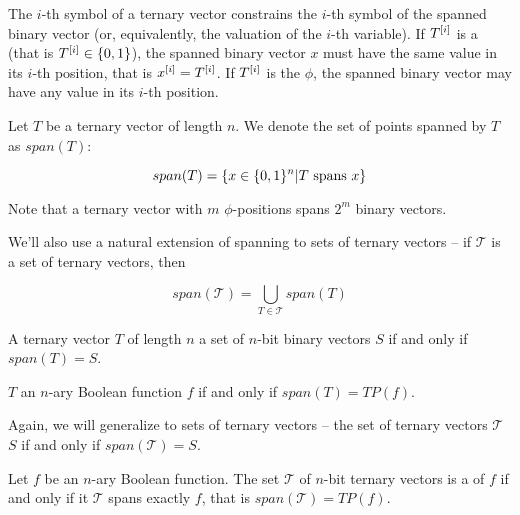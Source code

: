 The $i$-th symbol of a ternary vector
constrains the $i$-th symbol of the spanned binary vector
(or, equivalently, the valuation of the $i$-th variable).
If $T^{[i]}$ is a 
(that is $T^{[i]} \in \{0, 1\}$),
the spanned binary vector $x$
must have the same value
in its $i$-th position,
that is $x^{[i]} = T^{[i]}$.
If $T^{[i]}$ is the  $\phi$,
the spanned binary vector
may have any value in its $i$-th position.

\begin{definition}
Let $T$ be a ternary vector of length $n$.
We denote the set of points spanned by $T$
as $span(T)$:

\begin{equation*}
span(T) = \{
x \in \{0, 1\}^n |
T\text{ spans }x
\}
\end{equation*}
\end{definition}

Note that a ternary vector
with $m$ $\phi$-positions
spans $2^m$ binary vectors.

We'll also use a natural extension of spanning
to sets of ternary vectors --
if $\mathcal{T}$ is a set of ternary vectors, then

\begin{equation*}
span(\mathcal{T}) =
\bigcup_{T \in \mathcal{T}} span(T)
\end{equation*}

\begin{definition}
A ternary vector $T$ of length $n$
a set of $n$-bit binary vectors $S$
if and only if
$span(T) = S$.

$T$ 
an $n$-ary Boolean function $f$
if and only if
$span(T) = TP(f)$.
\end{definition}

Again,
we will generalize 
to sets of ternary vectors
-- the set of ternary vectors $\mathcal{T}$
 $S$
if and only if
$span(\mathcal{T}) = S$.

\begin{definition}
Let $f$ be an $n$-ary Boolean function.
The set $\mathcal{T}$ of $n$-bit ternary vectors
is a  of $f$
if and only if
it $\mathcal{T}$ spans exactly $f$,
that is
$span(\mathcal{T}) = TP(f)$.
\end{definition}

